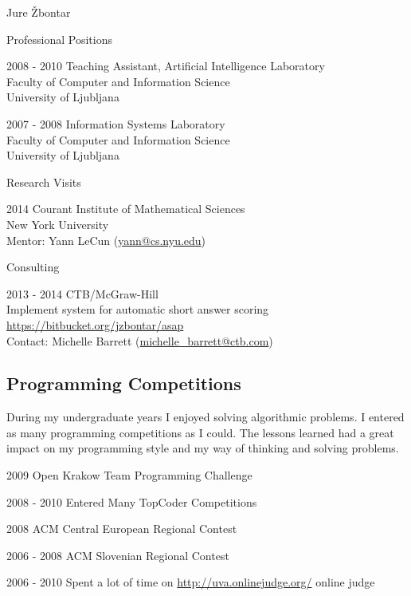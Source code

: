 \documentclass[12pt,a4paper]{article}
\begin{document}
\begin{cv}{Jure \v{Z}bontar}
\begin{cvlist}{Professional Positions}
\item[2008 - 2010] Teaching Assistant, Artificial Intelligence Laboratory \\
Faculty of Computer and Information Science \\
University of Ljubljana

\item[2007 - 2008] Information Systems Laboratory \\
Faculty of Computer and Information Science \\
University of Ljubljana

\end{cvlist}

\begin{cvlist}{Research Visits}
\item[2014] Courant Institute of Mathematical Sciences \\
New York University \\
Mentor: Yann LeCun (\href{mailto:yann@cs.nyu.edu}{yann@cs.nyu.edu})
\end{cvlist}

\begin{cvlist}{Consulting}
\item[2013 - 2014] CTB/McGraw-Hill \\
Implement system for automatic short answer scoring \\
\url{https://bitbucket.org/jzbontar/asap} \\
Contact: Michelle Barrett (\href{mailto:michelle_barrett@ctb.com}{michelle\_barrett@ctb.com})
\end{cvlist}

\subsection*{Programming Competitions}
During my undergraduate years I enjoyed solving algorithmic problems. I
entered as many programming competitions as I could. The lessons learned
had a great impact on my programming style and my way of thinking and
solving problems.

\begin{cvlist}{}
\item[2009] Open Krakow Team Programming Challenge
\item[2008 - 2010] Entered Many TopCoder Competitions
\item[2008] ACM Central European Regional Contest
\item[2006 - 2008] ACM Slovenian Regional Contest
\item[2006 - 2010] Spent a lot of time on \url{http://uva.onlinejudge.org/} online judge
\end{cvlist}


\end{cv}
\end{document}
